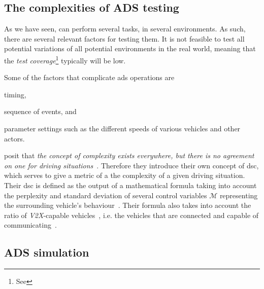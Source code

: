 \subsection{The complexities of ADS testing}\label{sec:adsTestingComplexity}

As we have seen,  can perform several tasks, in several environments. As such, there
are several relevant factors for testing them. It is not feasible to test all potential variations
of all potential environments in the real world, meaning that the \textit{test
    coverage}\footnote{See } typically will be low.

Some of the factors that complicate \acrshort{ads} operations are \begin{inparaenum}
    \item timing,
    \item sequence of events, and
    \item parameter settings such as the different speeds of various vehicles and other actors.
\end{inparaenum}

\citeauthor{adsComplexityIndex18} posit that \textit{the concept of complexity exists everywhere,
    but there is no agreement on one for driving situations}~\cite[1182]{adsComplexityIndex18}.
Therefore they introduce their own concept of \acrfull{dsc}, which serves to give a metric of a
the complexity of a given driving situation. Their \acrshort{dsc} is defined as the output of a
mathematical formula taking into account the perplexity and standard deviation of several
control variables $\mathcal{M}$ representing the surrounding vehicle's
behaviour~\cite[1182]{adsComplexityIndex18}. Their formula also takes into account the ratio of
\textit{V2X}-capable vehicles~\cite[1182]{adsComplexityIndex18}, i.e. the vehicles that are
connected and capable of communicating~\cite[1]{v2xTestingSurvey2019}.


\subsection{ADS simulation}

